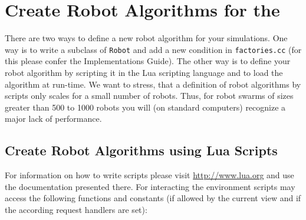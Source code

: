 \section{Create Robot Algorithms for the \RSS}
There are two ways to define a new robot algorithm for your simulations. One way is to write a subclass of \texttt{Robot} and add a new condition in \texttt{factories.cc} (for this please confer the Implementations Guide). The other way is to define your robot algorithm by scripting it in the {\sffamily Lua} scripting language and to load the algorithm at run-time. We want to stress, that a definition of robot algorithms by \Lua scripts only scales for a small number of robots. Thus, for robot swarms of sizes greater than 500 to 1000 robots you will (on standard computers) recognize a major lack of performance.

\subsection{Create Robot Algorithms using Lua Scripts}
For information on how to write \Lua scripts please visit \url{http://www.lua.org} and use the documentation presented there. For interacting the environment \Lua scripts may access the following functions and constants (if allowed by the current view and if the according request handlers are set):

